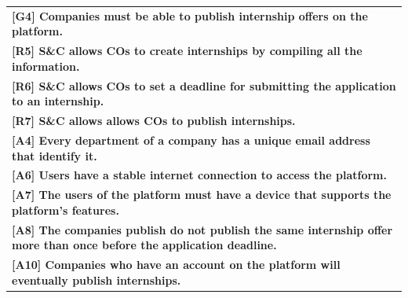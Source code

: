 \begin{center}
    \begin{tabular}{|p{37em}|}
        \rowcolor{bluepoli!40} %
        \hline
        \textbf{[G4] Companies must be able to publish internship offers on the platform.} \\
        \rowcolor{bluepoli!15}
        \textbf{[R5] S\&C allows COs to create internships by compiling all the information.} \\
        \rowcolor{bluepoli!15}
        \textbf{[R6] S\&C allows COs to set a deadline for submitting the application to an internship.}\\
        \rowcolor{bluepoli!15}
        \textbf{[R7] S\&C allows allows COs to publish internships.}\\
        \textbf{[A4] Every department of a company has a unique email address that identify it.}\\
        \textbf{[A6] Users have a stable internet connection to access the platform.}\\
        \textbf{[A7] The users of the platform must have a device that supports the platform's features.}\\
        \textbf{[A8] The companies publish do not publish the same internship offer more than once before the application deadline.}\\
        \textbf{[A10] Companies who have an account on the platform will eventually publish internships.}\\
        \hline
    \end{tabular}
\end{center}

